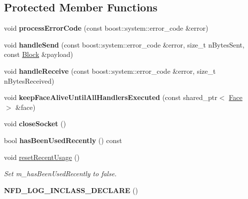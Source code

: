 \subsection*{Protected Member Functions}
\begin{DoxyCompactItemize}
\item 
void {\bfseries process\+Error\+Code} (const boost\+::system\+::error\+\_\+code \&error)\hypertarget{classnfd_1_1DatagramFace_a99c36c23edbb0252f6ece763397ca0c5}{}\label{classnfd_1_1DatagramFace_a99c36c23edbb0252f6ece763397ca0c5}

\item 
void {\bfseries handle\+Send} (const boost\+::system\+::error\+\_\+code \&error, size\+\_\+t n\+Bytes\+Sent, const \hyperlink{classndn_1_1Block}{Block} \&payload)\hypertarget{classnfd_1_1DatagramFace_ad8f069c43e39652536c9545dd01c61bc}{}\label{classnfd_1_1DatagramFace_ad8f069c43e39652536c9545dd01c61bc}

\item 
void {\bfseries handle\+Receive} (const boost\+::system\+::error\+\_\+code \&error, size\+\_\+t n\+Bytes\+Received)\hypertarget{classnfd_1_1DatagramFace_ae3fc3ba9d63fc64888cce2cacd716ae8}{}\label{classnfd_1_1DatagramFace_ae3fc3ba9d63fc64888cce2cacd716ae8}

\item 
void {\bfseries keep\+Face\+Alive\+Until\+All\+Handlers\+Executed} (const shared\+\_\+ptr$<$ \hyperlink{classnfd_1_1Face}{Face} $>$ \&face)\hypertarget{classnfd_1_1DatagramFace_ac98fdded60255977615b99988d1a67db}{}\label{classnfd_1_1DatagramFace_ac98fdded60255977615b99988d1a67db}

\item 
void {\bfseries close\+Socket} ()\hypertarget{classnfd_1_1DatagramFace_aa1028783da2257f0ea55780227f3287b}{}\label{classnfd_1_1DatagramFace_aa1028783da2257f0ea55780227f3287b}

\item 
bool {\bfseries has\+Been\+Used\+Recently} () const\hypertarget{classnfd_1_1DatagramFace_afe5ea1abc623362cf08262b1166016b8}{}\label{classnfd_1_1DatagramFace_afe5ea1abc623362cf08262b1166016b8}

\item 
void \hyperlink{classnfd_1_1DatagramFace_a1384ea0f0b1ab974473a38585c9c7015}{reset\+Recent\+Usage} ()\hypertarget{classnfd_1_1DatagramFace_a1384ea0f0b1ab974473a38585c9c7015}{}\label{classnfd_1_1DatagramFace_a1384ea0f0b1ab974473a38585c9c7015}

\begin{DoxyCompactList}\small\item\em Set m\+\_\+has\+Been\+Used\+Recently to false. \end{DoxyCompactList}\item 
{\bfseries N\+F\+D\+\_\+\+L\+O\+G\+\_\+\+I\+N\+C\+L\+A\+S\+S\+\_\+\+D\+E\+C\+L\+A\+RE} ()\hypertarget{classnfd_1_1DatagramFace_ad16fa02ed4ff2e0c8bca86374b580ebc}{}\label{classnfd_1_1DatagramFace_ad16fa02ed4ff2e0c8bca86374b580ebc}

\end{DoxyCompactItemize}
